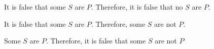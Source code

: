 \begin{exercises}
\item It is false that some $S$ are $P$. Therefore, it is false that no $S$ are $P$.

\item It is false that some $S$ are $P$. Therefore, some $S$ are not $P$.

\item Some $S$ are $P$. Therefore, it is false that some $S$ are not $P$



\end{exercises}

